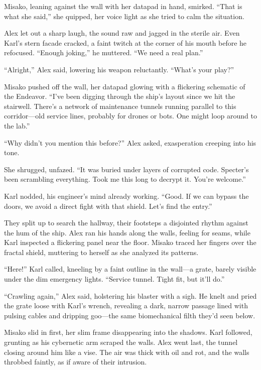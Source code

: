 \documentclass[12pt]{book}
\begin{document}
Misako, leaning against the wall with her datapad in hand, smirked. “That is what she said,” she quipped, her voice light as she tried to calm the situation.

Alex let out a sharp laugh, the sound raw and jagged in the sterile air. Even Karl’s stern facade cracked, a faint twitch at the corner of his mouth before he refocused. “Enough joking,” he muttered. “We need a real plan.”

“Alright,” Alex said, lowering his weapon reluctantly. “What’s your play?”

Misako pushed off the wall, her datapad glowing with a flickering schematic of the Endeavor. “I’ve been digging through the ship’s layout since we hit the stairwell. There’s a network of maintenance tunnels running parallel to this corridor—old service lines, probably for drones or bots. One might loop around to the lab.”

“Why didn’t you mention this before?” Alex asked, exasperation creeping into his tone.

She shrugged, unfazed. “It was buried under layers of corrupted code. Specter’s been scrambling everything. Took me this long to decrypt it. You’re welcome.”

Karl nodded, his engineer’s mind already working. “Good. If we can bypass the doors, we avoid a direct fight with that shield. Let’s find the entry.”

They split up to search the hallway, their footsteps a disjointed rhythm against the hum of the ship. Alex ran his hands along the walls, feeling for seams, while Karl inspected a flickering panel near the floor. Misako traced her fingers over the fractal shield, muttering to herself as she analyzed its patterns.

“Here!” Karl called, kneeling by a faint outline in the wall—a grate, barely visible under the dim emergency lights. “Service tunnel. Tight fit, but it’ll do.”

“Crawling again,” Alex said, holstering his blaster with a sigh. He knelt and pried the grate loose with Karl’s wrench, revealing a dark, narrow passage lined with pulsing cables and dripping goo—the same biomechanical filth they’d seen below.

Misako slid in first, her slim frame disappearing into the shadows. Karl followed, grunting as his cybernetic arm scraped the walls. Alex went last, the tunnel closing around him like a vise. The air was thick with oil and rot, and the walls throbbed faintly, as if aware of their intrusion.
\end{document}
